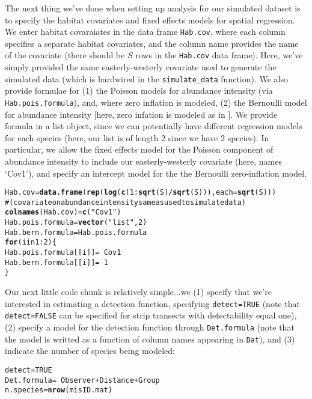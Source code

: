 \documentclass{article}\usepackage{graphicx, color}
\makeatletter
\newcommand{\hlfunctioncall}[1]{\textcolor[rgb]{0.501960784313725,0,0.329411764705882}{\textbf{#1}}}%
\newcommand{\hlstring}[1]{\textcolor[rgb]{0.6,0.6,1}{#1}}%
\newcommand{\hlcomment}[1]{\textcolor[rgb]{0.180392156862745,0.6,0.341176470588235}{#1}}%
\newenvironment{kframe}{%
 \def\at@end@of@kframe{}%
 \ifinner\ifhmode%
  \def\at@end@of@kframe{\end{minipage}}%
  \begin{minipage}{\columnwidth}%
 \fi\fi%
 \def\FrameCommand##1{\hskip\@totalleftmargin \hskip-\fboxsep
 \colorbox{shadecolor}{##1}\hskip-\fboxsep
     \hskip-\linewidth \hskip-\@totalleftmargin \hskip\columnwidth}%
 \MakeFramed {\advance\hsize-\width
   \@totalleftmargin\z@ \linewidth\hsize
   \@setminipage}}%
 {\par\unskip\endMakeFramed%
 \at@end@of@kframe}
\newenvironment{knitrout}{}{} %
\makeatother
\begin{document}
The next thing we've done when setting up analysis for our simulated dataset is
to specify the habitat covariates and fixed effects models for spatial regression.
We enter habitat covaraiates in the data frame \texttt{Hab.cov}, where each column specifies a 
separate habitat covariates, and the column name provides the name of the covariate (there should be $S$ rows in the \texttt{Hab.cov} data frame).  Here, we've simply provided the same easterly-westerly covariate used to generate the simulated data (which is hardwired in the \texttt{simulate\_data} function).  We also provide formulae for (1) the Poisson models for abundance intensity (via \texttt{Hab.pois.formula}), and, where zero inflation is modeled, (2) the Bernoulli model for abundance intensity [here, zero infation is modeled as in \citet{AgarwalEtAl2002}].
We provide formula in a list object, since we can potentially have different regression models for each species (here, our list is of length 2 since we have 2 species).  In particular, we allow the fixed effects model for the Poisson component of abundance intensity to include our easterly-westerly covariate (here, names `Cov1'), and specify an intercept model for the the Bernoulli zero-inflation model.
\begin{knitrout}
\color{fgcolor}\begin{kframe}
\begin{alltt}
Hab.cov = \hlfunctioncall{data.frame}(\hlfunctioncall{rep}(\hlfunctioncall{log}(\hlfunctioncall{c}(1:\hlfunctioncall{sqrt}(S)/\hlfunctioncall{sqrt}(S))), each = \hlfunctioncall{sqrt}(S)))
\hlcomment{# (covariate on abundance intensity same as used to simulate data)}
\hlfunctioncall{colnames}(Hab.cov) = \hlfunctioncall{c}(\hlstring{"Cov1"})
Hab.pois.formula = \hlfunctioncall{vector}(\hlstring{"list"}, 2)
Hab.bern.formula = Hab.pois.formula
\hlfunctioncall{for} (i in 1:2) \{
    Hab.pois.formula[[i]] = ~Cov1
    Hab.bern.formula[[i]] = ~1
\}
\end{alltt}
\end{kframe}
\end{knitrout}


Our next little code chunk is relatively simple...we (1) specify that we're
interested in estimating a detection function, specifying \texttt{detect=TRUE} (note that \texttt{detect=FALSE} can be specified for strip transects with detectability equal one), (2) specify a model for the detection function through \texttt{Det.formula} (note that the model is writted as a function of column names appearing in \texttt{Dat}), and (3) indicate the number of species being modeled:
\begin{knitrout}
\color{fgcolor}\begin{kframe}
\begin{alltt}
detect = TRUE
Det.formula = ~Observer + Distance + Group
n.species = \hlfunctioncall{nrow}(misID.mat)
\end{alltt}
\end{kframe}
\end{knitrout}
\end{document}
